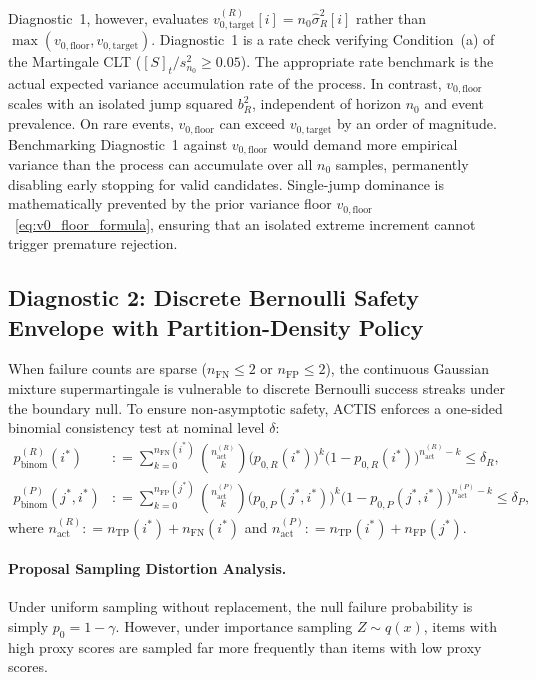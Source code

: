 \documentclass[11pt,a4paper]{article}
\newcommand{\coloneqq}{\mathrel{\mathop:}=}
\begin{document}
Diagnostic~1, however, evaluates $v_{0, \text{target}}^{(R)}[i] = n_0 \hat{\sigma}_R^2[i]$ rather than $\max(v_{0, \text{floor}}, v_{0, \text{target}})$. Diagnostic~1 is a rate check verifying Condition~(a) of the Martingale CLT ($[S]_t / s_{n_0}^2 \ge 0.05$). The appropriate rate benchmark is the actual expected variance accumulation rate of the process. In contrast, $v_{0, \text{floor}}$ scales with an isolated jump squared $b_R^2$, independent of horizon $n_0$ and event prevalence. On rare events, $v_{0, \text{floor}}$ can exceed $v_{0, \text{target}}$ by an order of magnitude. Benchmarking Diagnostic~1 against $v_{0, \text{floor}}$ would demand more empirical variance than the process can accumulate over all $n_0$ samples, permanently disabling early stopping for valid candidates. Single-jump dominance is mathematically prevented by the prior variance floor $v_{0, \text{floor}}$~\eqref{eq:v0_floor_formula}, ensuring that an isolated extreme increment cannot trigger premature rejection.

\subsection{Diagnostic 2: Discrete Bernoulli Safety Envelope with Partition-Density Policy}
When failure counts are sparse ($n_{\text{FN}} \le 2$ or $n_{\text{FP}} \le 2$), the continuous Gaussian mixture supermartingale is vulnerable to discrete Bernoulli success streaks under the boundary null. To ensure non-asymptotic safety, ACTIS enforces a one-sided binomial consistency test at nominal level $\delta$:
\begin{align}
p_{\text{binom}}^{(R)}(i^*) &\coloneqq \sum_{k=0}^{n_{\text{FN}}(i^*)} \binom{n_{\text{act}}^{(R)}}{k} \big(p_{0, R}(i^*)\big)^k \big(1 - p_{0, R}(i^*)\big)^{n_{\text{act}}^{(R)} - k} \le \delta_R, \label{eq:check_binom_r} \\
p_{\text{binom}}^{(P)}(j^*, i^*) &\coloneqq \sum_{k=0}^{n_{\text{FP}}(j^*)} \binom{n_{\text{act}}^{(P)}}{k} \big(p_{0, P}(j^*, i^*)\big)^k \big(1 - p_{0, P}(j^*, i^*)\big)^{n_{\text{act}}^{(P)} - k} \le \delta_P, \label{eq:check_binom_p}
\end{align}
where $n_{\text{act}}^{(R)} \coloneqq n_{\text{TP}}(i^*) + n_{\text{FN}}(i^*)$ and $n_{\text{act}}^{(P)} \coloneqq n_{\text{TP}}(i^*) + n_{\text{FP}}(j^*)$.

\paragraph{Proposal Sampling Distortion Analysis.}
Under uniform sampling without replacement, the null failure probability is simply $p_0 = 1 - \gamma$. However, under importance sampling $Z \sim q(x)$, items with high proxy scores are sampled far more frequently than items with low proxy scores. 
\end{document}
